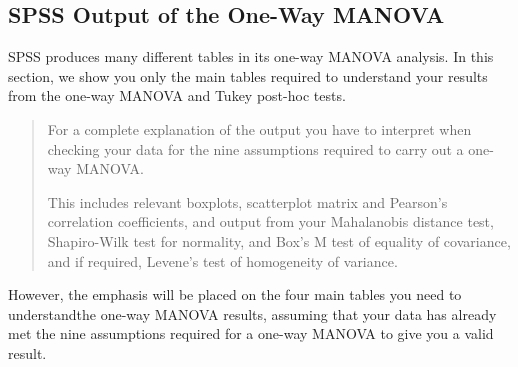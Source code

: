 \documentclass[a4paper,12pt]{article}
\begin{document}
\subsection{SPSS Output of the One-Way MANOVA}
SPSS produces many different tables in its one-way MANOVA analysis. In this section, we show you only the main tables required to understand your results from the one-way MANOVA and Tukey post-hoc tests.

\begin{quote}
For a complete explanation of the output you have to interpret when checking your data for the nine assumptions required to carry out a one-way MANOVA.

This includes relevant boxplots, scatterplot matrix and Pearson's correlation coefficients, and output from your Mahalanobis distance test, Shapiro-Wilk test for normality, and Box's M test of equality of covariance, and if required, Levene's test of homogeneity of variance.
\end{quote}
However, the emphasis will be placed on the four main tables you need to understandthe one-way MANOVA results, assuming that your data has already met the nine assumptions required for a one-way MANOVA to give you a valid result.
\end{document}
